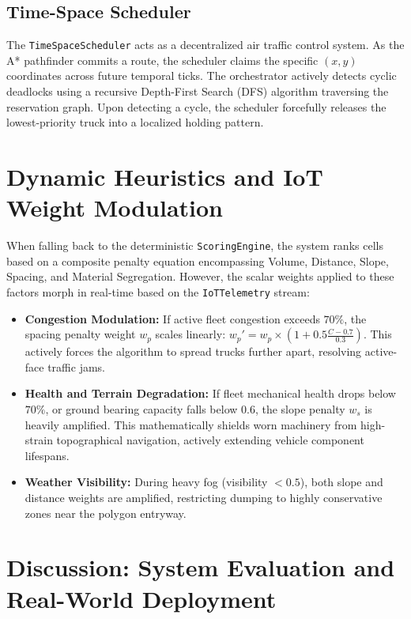 \documentclass[conference]{IEEEtran}
\begin{document}
\subsection{Time-Space Scheduler}
The \texttt{TimeSpaceScheduler} acts as a decentralized air traffic control system. As the A* pathfinder commits a route, the scheduler claims the specific $(x, y)$ coordinates across future temporal ticks. The orchestrator actively detects cyclic deadlocks using a recursive Depth-First Search (DFS) algorithm traversing the reservation graph. Upon detecting a cycle, the scheduler forcefully releases the lowest-priority truck into a localized holding pattern.

\section{Dynamic Heuristics and IoT Weight Modulation}

When falling back to the deterministic \texttt{ScoringEngine}, the system ranks cells based on a composite penalty equation encompassing Volume, Distance, Slope, Spacing, and Material Segregation. However, the scalar weights applied to these factors morph in real-time based on the \texttt{IoTTelemetry} stream:
\begin{itemize}
    \item \textbf{Congestion Modulation:} If active fleet congestion exceeds $70\%$, the spacing penalty weight $w_p$ scales linearly: $w_p' = w_p \times (1 + 0.5 \frac{C - 0.7}{0.3})$. This actively forces the algorithm to spread trucks further apart, resolving active-face traffic jams.
    \item \textbf{Health and Terrain Degradation:} If fleet mechanical health drops below $70\%$, or ground bearing capacity falls below $0.6$, the slope penalty $w_s$ is heavily amplified. This mathematically shields worn machinery from high-strain topographical navigation, actively extending vehicle component lifespans.
    \item \textbf{Weather Visibility:} During heavy fog (visibility $<0.5$), both slope and distance weights are amplified, restricting dumping to highly conservative zones near the polygon entryway.
\end{itemize}

\section{Discussion: System Evaluation and Real-World Deployment}
\end{document}
